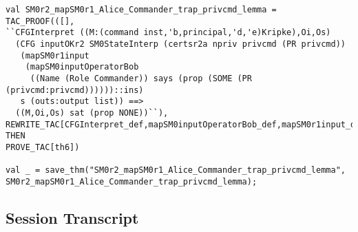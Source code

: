 \documentclass{report}
\begin{document}
\begin{lstlisting}[frame=TBlr]
val SM0r2_mapSM0r1_Alice_Commander_trap_privcmd_lemma =
TAC_PROOF(([],
``CFGInterpret ((M:(command inst,'b,principal,'d,'e)Kripke),Oi,Os)
  (CFG inputOKr2 SM0StateInterp (certsr2a npriv privcmd (PR privcmd))
   (mapSM0r1input
    (mapSM0inputOperatorBob
     ((Name (Role Commander)) says (prop (SOME (PR (privcmd:privcmd))))))::ins)
   s (outs:output list)) ==>
  ((M,Oi,Os) sat (prop NONE))``),
REWRITE_TAC[CFGInterpret_def,mapSM0inputOperatorBob_def,mapSM0r1input_def] THEN
PROVE_TAC[th6])

val _ = save_thm("SM0r2_mapSM0r1_Alice_Commander_trap_privcmd_lemma",
SM0r2_mapSM0r1_Alice_Commander_trap_privcmd_lemma);

\end{lstlisting}

\subsection{Session Transcript}
\label{trans1}
\end{document}
